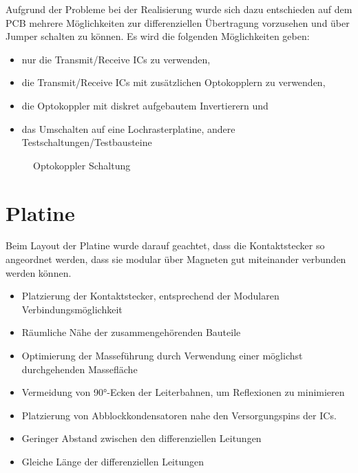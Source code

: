Aufgrund der Probleme bei der Realisierung wurde sich dazu entschieden auf dem PCB mehrere Möglichkeiten zur differenziellen Übertragung vorzusehen 
und über Jumper schalten zu können. 
Es wird die folgenden Möglichkeiten geben:

\begin{itemize}
\item nur die Transmit/Receive ICs zu verwenden,
\item die Transmit/Receive ICs mit zusätzlichen Optokopplern zu verwenden,
\item die Optokoppler mit diskret aufgebautem Invertierern und
\item das Umschalten auf eine Lochrasterplatine, andere Testschaltungen/Testbausteine
\end{itemize}



\begin{figure}[H]
    \centering    
    \caption{Optokoppler Schaltung}
    \label{Optokoppler}
\end{figure}



\newpage
\section{Platine}
Beim Layout der Platine wurde darauf geachtet, dass die Kontaktstecker so angeordnet werden, dass sie modular über Magneten gut miteinander verbunden werden können. 

\begin{itemize}
	\item Platzierung der Kontaktstecker, entsprechend der Modularen Verbindungsmöglichkeit
	\item Räumliche Nähe der zusammengehörenden Bauteile
	\item Optimierung der Masseführung durch Verwendung einer möglichst durchgehenden Massefläche
	\item Vermeidung von 90°-Ecken der Leiterbahnen, um Reflexionen zu minimieren
	\item Platzierung von Abblockkondensatoren nahe den Versorgungspins der ICs.
	\item Geringer Abstand zwischen den differenziellen Leitungen
	\item Gleiche Länge der differenziellen Leitungen
\end{itemize}




